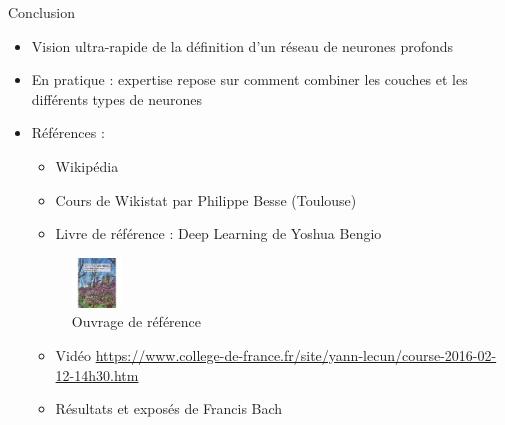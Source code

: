 \documentclass[ignorenonframetext,]{beamer}
\providecommand{\tightlist}{%
  \setlength{\itemsep}{0pt}\setlength{\parskip}{0pt}}
\begin{document}
\begin{frame}{Conclusion}

\begin{itemize}
\tightlist
\item
  Vision ultra-rapide de la définition d'un réseau de neurones profonds
\item
  En pratique : expertise repose sur comment combiner les couches et les
  différents types de neurones
\item
  Références :

  \begin{itemize}
  \tightlist
  \item
    Wikipédia
  \item
    Cours de Wikistat par Philippe Besse (Toulouse)
  \item
    Livre de référence : Deep Learning de Yoshua Bengio
  \end{itemize}

  \begin{figure}
  \centering
  \includegraphics[width=0.52083in]{livre_bengio.jpg}
  \caption{Ouvrage de référence}
  \end{figure}

  \begin{itemize}
  \tightlist
  \item
    Vidéo
    \url{https://www.college-de-france.fr/site/yann-lecun/course-2016-02-12-14h30.htm}
  \item
    Résultats et exposés de Francis Bach
  \end{itemize}
\end{itemize}

\end{frame}
\end{document}
